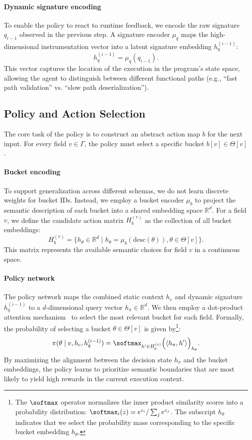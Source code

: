 \paragraph{Dynamic signature encoding}
To enable the policy to react to runtime feedback, we encode the raw signature $q_{i-1}$ observed in the previous step. A signature encoder $\mu_q$ maps the high-dimensional instrumentation vector into a latent signature embedding $h_q^{(i-1)}$:
\[
    h_q^{(i-1)} = \mu_q(q_{i-1}).
\]
This vector captures the location of the execution in the program's state space, allowing the agent to distinguish between different functional paths (e.g., ``fast path validation'' vs. ``slow path deserialization'').

\subsection{Policy and Action Selection}
\label{sec:policy_action}

The core task of the policy is to construct an abstract action map $b$ for the next input. For every field $v \in \Gamma$, the policy must select a specific bucket $b[v] \in \Theta[v]$.

\paragraph{Bucket encoding}
To support generalization across different schemas, we do not learn discrete weights for bucket IDs. Instead, we employ a bucket encoder $\mu_b$ to project the semantic description of each bucket into a shared embedding space $\mathbb{R}^d$. For a field $v$, we define the candidate action matrix $H_b^{(v)}$ as the collection of all bucket embeddings:
\[
    H_b^{(v)} = \{ h_\theta \in \mathbb{R}^d \mid h_\theta = \mu_b(\text{desc}(\theta)), \theta \in \Theta[v] \}.
\]
This matrix represents the available semantic choices for field $v$ in a continuous space.

\paragraph{Policy network}
The policy network maps the combined static context $h_c$ and dynamic signature $h_q^{(i-1)}$ to a $d$-dimensional query vector $h_\pi \in \mathbb{R}^d$. We then employ a dot-product attention mechanism~\cite{vaswani2017attention} to select the most relevant bucket for each field. Formally, the probability of selecting a bucket $\theta \in \Theta[v]$ is given by\footnote{The $\softmax$ operator normalizes the inner product similarity scores into a probability distribution: $\softmax_i(z) = e^{z_i} / \sum_j e^{z_j}$. The subscript $h_\theta$ indicates that we select the probability mass corresponding to the specific bucket embedding $h_\theta$.}:
\[
    \pi(\theta \mid v, h_c, h_q^{(i-1)}) = \softmax_{h' \in H_b^{(v)}} \Big( \langle h_\pi, h' \rangle \Big)_{h_\theta}.
\]
By maximizing the alignment between the decision state $h_\pi$ and the bucket embeddings, the policy learns to prioritize semantic boundaries that are most likely to yield high rewards in the current execution context.

